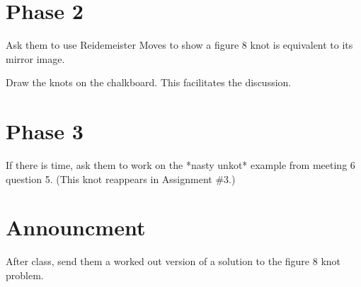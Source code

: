 \documentclass[12pt]{amsart}
\theoremstyle{definition}
\begin{document}
\section*{Phase 2}
Ask them to use Reidemeister Moves to show a figure 8 knot is equivalent to its mirror image.

Draw the knots on the chalkboard. This facilitates the discussion.

\section*{Phase 3}
If there is time, ask them to work on the *nasty unkot* example from meeting 6 question 5. (This knot reappears in Assignment \#3.)

\section*{Announcment}
After class, send them a worked out version of a solution to the figure 8 knot problem.
\end{document}
